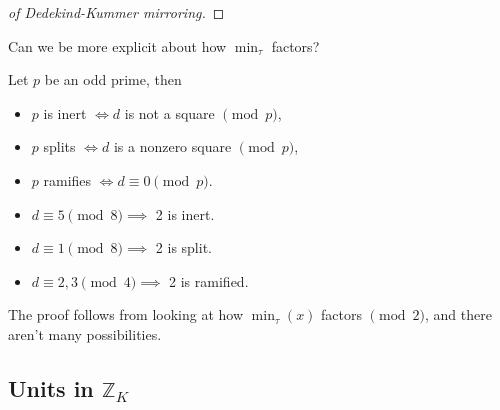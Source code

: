 \begin{proof}[of Dedekind-Kummer mirroring]
\end{proof}

\begin{question}

Can we be more explicit about how \(\min_\tau\) factors?

\end{question}

\begin{proposition}

Let \(p\) be an odd prime, then

\begin{itemize}
\tightlist
\item
  \(p\) is inert \(\iff d\) is not a square \(\pmod p\),
\item
  \(p\) splits \(\iff d\) is a nonzero square \(\pmod p\),
\item
  \(p\) ramifies \(\iff d \equiv 0 \pmod p\).
\end{itemize}

\end{proposition}

\begin{proposition}

\envlist

\begin{itemize}
\tightlist
\item
  \(d \equiv 5 \pmod 8 \implies\) 2 is inert.
\item
  \(d \equiv 1 \pmod 8 \implies\) 2 is split.
\item
  \(d \equiv 2, 3 \pmod 4 \implies\) 2 is ramified.
\end{itemize}

\end{proposition}

\begin{remark}

The proof follows from looking at how \(\min_\tau(x)\) factors
\(\pmod 2\), and there aren't many possibilities.

\end{remark}

\hypertarget{units-in-mathbbz_k}{%
\subsection{\texorpdfstring{Units in
\({\mathbb{Z}}_K\)}{Units in \{\textbackslash mathbb\{Z\}\}\_K}}\label{units-in-mathbbz_k}}


